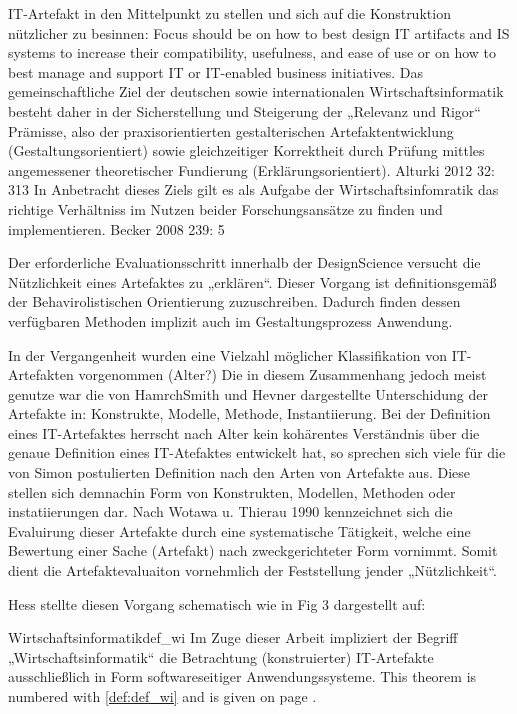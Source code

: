 IT-Artefakt in den Mittelpunkt zu stellen und sich auf die Konstruktion nützlicher zu besinnen: Focus should be on how to best design IT artifacts and IS systems to increase their compatibility, usefulness, and ease of use or on how to best manage and support IT or IT-enabled business initiatives.
Das gemeinschaftliche Ziel der deutschen sowie internationalen Wirtschaftsinformatik besteht daher in der Sicherstellung und Steigerung der „Relevanz und Rigor“ Prämisse, also der praxisorientierten gestalterischen Artefaktentwicklung (Gestaltungsorientiert) sowie gleichzeitiger Korrektheit durch Prüfung mittles angemessener theoretischer Fundierung (Erklärungsorientiert). {Alturki 2012 32: 313} In Anbetracht dieses Ziels gilt es als Aufgabe der Wirtschaftsinfomratik das  richtige Verhältniss im Nutzen beider Forschungsansätze zu finden und implementieren. {Becker 2008 239: 5}

Der erforderliche Evaluationsschritt innerhalb der DesignScience versucht die Nützlichkeit eines Artefaktes zu „erklären“. Dieser Vorgang ist definitionsgemäß der Behavirolistischen Orientierung zuzuschreiben. Dadurch finden dessen verfügbaren Methoden implizit auch im Gestaltungsprozess Anwendung.  


In der Vergangenheit wurden eine Vielzahl möglicher Klassifikation von IT-Artefakten vorgenommen (Alter?) Die in diesem Zusammenhang jedoch meist genutze war die von HamrchSmith und Hevner dargestellte Unterschidung der Artefakte in: Konstrukte, Modelle, Methode, Instantiierung.
Bei der Definition eines IT-Artefaktes herrscht nach Alter kein kohärentes Verständnis über die genaue Definition eines IT-Atefaktes entwickelt hat, so sprechen sich viele für die von Simon postulierten Definition nach den Arten von Artefakte aus. Diese stellen sich demnachin Form von Konstrukten, Modellen, Methoden oder instatiierungen dar.
Nach Wotawa u. Thierau 1990 kennzeichnet sich die Evaluirung dieser Artefakte durch eine systematische Tätigkeit, welche eine Bewertung einer Sache (Artefakt) nach zweckgerichteter Form vornimmt. Somit dient die Artefaktevaluaiton vornehmlich der Feststellung jender „Nützlichkeit“.

Hess stellte diesen Vorgang schematisch wie in Fig 3 dargestellt auf:




\vspace{1cm}


\begin{mydef}{Wirtschaftsinformatik}{def_wi}
  Im Zuge dieser Arbeit impliziert der Begriff „Wirtschaftsinformatik“ die Betrachtung (konstruierter) IT-Artefakte ausschließlich in Form softwareseitiger Anwendungssysteme.
  This theorem is numbered with  \ref{def:def_wi} and is given on page \pageref{def:def_wi}.
\end{mydef}


